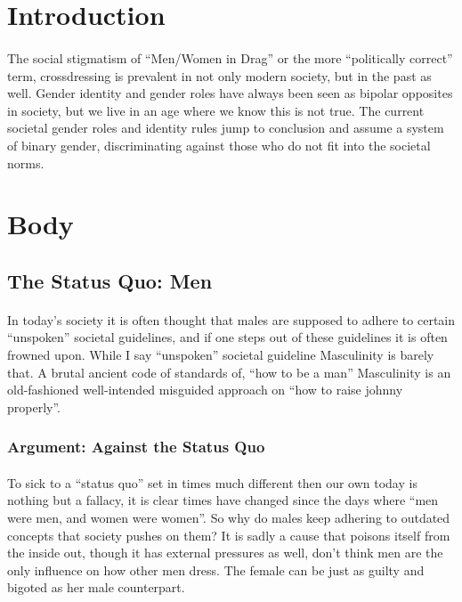 \doublespacing

\section{Introduction}
\paragraph{}
The social stigmatism of ``Men/Women in Drag'' or the more ``politically
correct'' term, crossdressing is prevalent in not only modern society, but in
the past as well. Gender identity and gender roles have always been seen as
bipolar opposites in society, but we live in an age where we know this is not
true. The current societal gender roles and identity rules jump to conclusion
and assume a system of binary gender, discriminating against those who do not
fit into the societal norms.
\par

\section{Body}
\subsection{The Status Quo: Men}
\paragraph{}
In today's society it is often thought that males are supposed to adhere to
certain ``unspoken'' societal guidelines, and if one steps out of these
guidelines it is often frowned upon. While I say ``unspoken'' societal guideline
Masculinity is barely that. A brutal ancient code of standards of, ``how to be a
man'' Masculinity is an old-fashioned well-intended misguided approach on ``how
to raise johnny properly''.
\par

\subsubsection{Argument: Against the Status Quo}
\paragraph{}
To sick to a ``status quo'' set in times much different then our own today is
nothing but a fallacy, it is clear times have changed since the days where ``men
were men, and women were women''. So why do males keep adhering to outdated
concepts that society pushes on them? It is sadly a cause that poisons itself
from the inside out, though it has external pressures as well, don't think men
are the only influence on how other men dress. The female can be just as guilty
and bigoted as her male counterpart.
\par

